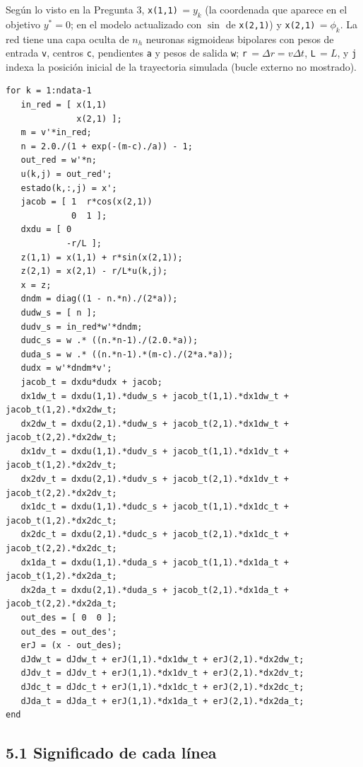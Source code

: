 \documentclass[11pt,a4paper]{article}
\begin{document}
Según lo visto en la Pregunta 3, \texttt{x(1,1)}$\,=y_k$ (la coordenada que aparece en el objetivo $y^{*}=0$; en el modelo actualizado con $\sin$ de \texttt{x(2,1)}) y \texttt{x(2,1)}$\,=\phi_k$. La red tiene una capa oculta de $n_h$ neuronas sigmoideas bipolares con pesos de entrada \texttt{v}, centros \texttt{c}, pendientes \texttt{a} y pesos de salida \texttt{w}; \texttt{r}$\,=\Delta r=v\Delta t$, \texttt{L}$\,=L$, y \texttt{j} indexa la posición inicial de la trayectoria simulada (bucle externo no mostrado).

\begin{lstlisting}
for k = 1:ndata-1
   in_red = [ x(1,1)
              x(2,1) ];
   m = v'*in_red;
   n = 2.0./(1 + exp(-(m-c)./a)) - 1;
   out_red = w'*n;
   u(k,j) = out_red';
   estado(k,:,j) = x';
   jacob = [ 1  r*cos(x(2,1))
             0  1 ];
   dxdu = [ 0
            -r/L ];
   z(1,1) = x(1,1) + r*sin(x(2,1));
   z(2,1) = x(2,1) - r/L*u(k,j);
   x = z;
   dndm = diag((1 - n.*n)./(2*a));
   dudw_s = [ n ];
   dudv_s = in_red*w'*dndm;
   dudc_s = w .* ((n.*n-1)./(2.0.*a));
   duda_s = w .* ((n.*n-1).*(m-c)./(2*a.*a));
   dudx = w'*dndm*v';
   jacob_t = dxdu*dudx + jacob;
   dx1dw_t = dxdu(1,1).*dudw_s + jacob_t(1,1).*dx1dw_t + jacob_t(1,2).*dx2dw_t;
   dx2dw_t = dxdu(2,1).*dudw_s + jacob_t(2,1).*dx1dw_t + jacob_t(2,2).*dx2dw_t;
   dx1dv_t = dxdu(1,1).*dudv_s + jacob_t(1,1).*dx1dv_t + jacob_t(1,2).*dx2dv_t;
   dx2dv_t = dxdu(2,1).*dudv_s + jacob_t(2,1).*dx1dv_t + jacob_t(2,2).*dx2dv_t;
   dx1dc_t = dxdu(1,1).*dudc_s + jacob_t(1,1).*dx1dc_t + jacob_t(1,2).*dx2dc_t;
   dx2dc_t = dxdu(2,1).*dudc_s + jacob_t(2,1).*dx1dc_t + jacob_t(2,2).*dx2dc_t;
   dx1da_t = dxdu(1,1).*duda_s + jacob_t(1,1).*dx1da_t + jacob_t(1,2).*dx2da_t;
   dx2da_t = dxdu(2,1).*duda_s + jacob_t(2,1).*dx1da_t + jacob_t(2,2).*dx2da_t;
   out_des = [ 0  0 ];
   out_des = out_des';
   erJ = (x - out_des);
   dJdw_t = dJdw_t + erJ(1,1).*dx1dw_t + erJ(2,1).*dx2dw_t;
   dJdv_t = dJdv_t + erJ(1,1).*dx1dv_t + erJ(2,1).*dx2dv_t;
   dJdc_t = dJdc_t + erJ(1,1).*dx1dc_t + erJ(2,1).*dx2dc_t;
   dJda_t = dJda_t + erJ(1,1).*dx1da_t + erJ(2,1).*dx2da_t;
end
\end{lstlisting}

\subsection*{5.1 Significado de cada línea}
\end{document}
